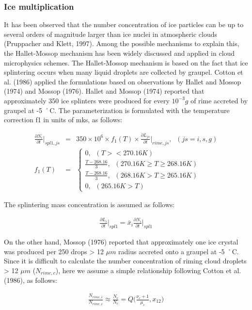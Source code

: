 \subsubsection{Ice multiplication}
It has been observed that the number concentration of ice particles can be up to several orders of magnitude larger than ice nuclei in atmospheric clouds (Pruppacher and Klett, 1997). Among the possible mechanisms to explain this, the Hallet-Mossop mechanism has been widely discussed and applied in cloud microphysics schemes. The Hallet-Mossop mechanism is based on the fact that ice splintering occurs when many liquid droplets are collected by graupel. Cotton et al. (1986) applied the formulations based on observations by Hallet and Mossop (1974) and Mossop (1976).
Hallet and Mossop (1974) reported that approximately 350 ice splinters were produced for every $10^{-3} g$ of rime accreted by graupel at -5 ˚C. The parameterization is formulated with the temperature correction f1 in units of mks, as follows:

\begin{eqnarray}
\frac{\partial N_{i}}{\partial t}\Bigr|_{spl1,js}&=&350\times 10^{6}\times f_{1}(T)\times\frac{\partial L_{js}}{\partial t}\Bigr|_{rime,js},\;\;(js=i,s,g)\label{sn212}\\
f_{1}(T)&=&
\left\{
\begin{array}{l}
0,\;\;(T><270.16K) \\
\frac{T-268.16}{3},\;\;(270.16K \geq T \geq 268.16K) \\
\frac{T-268.16}{3},\;\;(268.16K > T \geq 265.16K) \\
0,\;\;(265.16K>T)
\label{sn213}
\end{array}
\right.
\end{eqnarray}

The splintering mass concentration is assumed as follows:

\begin{eqnarray}
\frac{\partial L_{i}}{\partial t}\Bigr|_{spl1}=\bar{x}_{i}\frac{\partial N_{i}}{\partial t}\Bigr|_{spl1}\label{sn214}
\end{eqnarray}

On the other hand, Mossop (1976) reported that approximately one ice crystal was produced per 250 drops > 12 $\mu m$ radius accreted onto a graupel at -5 ˚C. Since it is difficult to calculate the number concentration of riming cloud droplets > 12 $\mu m$ ($N_{rime,c}$), here we assume a simple relationship following Cotton et al. (1986), as follows:

\begin{eqnarray}
\frac{N_{rime,c}}{N_{rime,c}}\approx\frac{N_{c}}{N_{c}}=Q\bigl(\frac{\nu_{c}+1}{\mu_{c}},x_{12}\bigr)\label{sn215}
\end{eqnarray}

